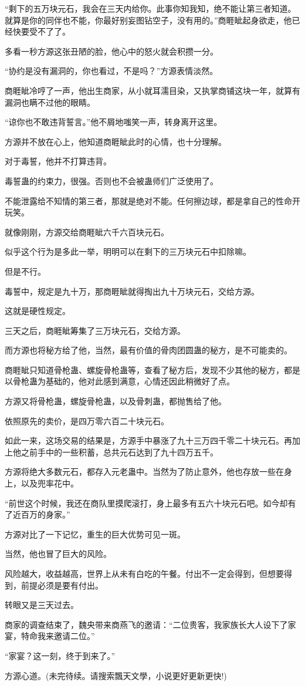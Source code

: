 \begin{this_body}
“剩下的五万块元石，我会在三天内给你。此事你知我知，绝不能让第三者知道。就算是你的同伴也不能，你最好别妄图钻空子，没有用的。”商睚眦起身欲走，他已经快要受不了了。

多看一秒方源这张丑陋的脸，他心中的怒火就会积攒一分。

“协约是没有漏洞的，你也看过，不是吗？”方源表情淡然。

商睚眦冷哼了一声，他出生商家，从小就耳濡目染，又执掌商铺这块一年，就算有漏洞也瞒不过他的眼睛。

“谅你也不敢违背誓言。”他不屑地嗤笑一声，转身离开这里。

方源并不放在心上，他知道商睚眦此时的心情，也十分理解。

对于毒誓，他并不打算违背。

毒誓蛊的约束力，很强。否则也不会被蛊师们广泛使用了。

不能泄露给不知情的第三者，那就是绝对不能。任何擦边球，都是拿自己的性命开玩笑。

就像刚刚，方源交给商睚眦六千六百块元石。

似乎这个行为是多此一举，明明可以在剩下的三万块元石中扣除嘛。

但是不行。

毒誓中，规定是九十万，那商睚眦就得掏出九十万块元石，交给方源。

这就是硬性规定。

三天之后，商睚眦筹集了三万块元石，交给方源。

而方源也将秘方给了他，当然，最有价值的骨肉团圆蛊的秘方，是不可能卖的。

商睚眦只知道骨枪蛊、螺旋骨枪蛊等，查看了秘方后，发现不少其他的秘方，都是以骨枪蛊为基础的，他对此感到满意，心情还因此稍微好了点。

方源又将骨枪蛊，螺旋骨枪蛊，以及骨刺蛊，都抛售给了他。

依照原先的卖价，是四万零六百二十块元石。

如此一来，这场交易的结果是，方源手中暴涨了九十三万四千零二十块元石。再加上他之前手中的一些积蓄，总共元石达到了九十四万五千。

方源将绝大多数元石，都存入元老蛊中。当然为了防止意外，他也存放一些在身上，以及兜率花中。

“前世这个时候，我还在商队里摸爬滚打，身上最多有五六十块元石吧。如今却有了近百万的身家。”

方源对比了一下记忆，重生的巨大优势可见一斑。

当然，他也冒了巨大的风险。

风险越大，收益越高，世界上从未有白吃的午餐。付出不一定会得到，但想要得到，前提必须是要有付出。

转眼又是三天过去。

商家的调查结束了，魏央带来商燕飞的邀请：“二位贵客，我家族长大人设下了家宴，特命我来邀请二位。”

“家宴？这一刻，终于到来了。”

方源心道。(未完待续。请搜索飄天文學，小说更好更新更快!)

\end{this_body}

